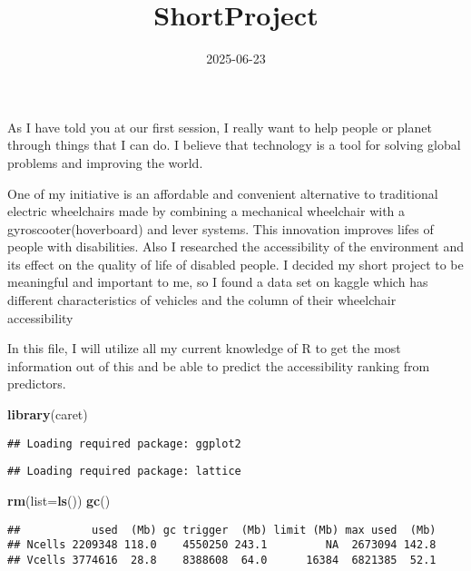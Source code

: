 \documentclass[
]{article}
\title{ShortProject}
\author{}
\date{\vspace{-2.5em}2025-06-23}
\newenvironment{Shaded}{\begin{snugshade}}{\end{snugshade}}
\newcommand{\AttributeTok}[1]{\textcolor[rgb]{0.13,0.29,0.53}{#1}}
\newcommand{\FunctionTok}[1]{\textcolor[rgb]{0.13,0.29,0.53}{\textbf{#1}}}
\newcommand{\NormalTok}[1]{#1}
\begin{document}
\maketitle

As I have told you at our first session, I really want to help people or
planet through things that I can do. I believe that technology is a tool
for solving global problems and improving the world.

One of my initiative is an affordable and convenient alternative to
traditional electric wheelchairs made by combining a mechanical
wheelchair with a gyroscooter(hoverboard) and lever systems. This
innovation improves lifes of people with disabilities. Also I researched
the accessibility of the environment and its effect on the quality of
life of disabled people. I decided my short project to be meaningful and
important to me, so I found a data set on kaggle which has different
characteristics of vehicles and the column of their wheelchair
accessibility

In this file, I will utilize all my current knowledge of R to get the
most information out of this and be able to predict the accessibility
ranking from predictors.

\begin{Shaded}
\begin{Highlighting}[]
\FunctionTok{library}\NormalTok{(caret)}
\end{Highlighting}
\end{Shaded}

\begin{verbatim}
## Loading required package: ggplot2
\end{verbatim}

\begin{verbatim}
## Loading required package: lattice
\end{verbatim}

\begin{Shaded}
\begin{Highlighting}[]
\FunctionTok{rm}\NormalTok{(}\AttributeTok{list=}\FunctionTok{ls}\NormalTok{())}
\FunctionTok{gc}\NormalTok{()}
\end{Highlighting}
\end{Shaded}

\begin{verbatim}
##           used  (Mb) gc trigger  (Mb) limit (Mb) max used  (Mb)
## Ncells 2209348 118.0    4550250 243.1         NA  2673094 142.8
## Vcells 3774616  28.8    8388608  64.0      16384  6821385  52.1
\end{verbatim}
\end{document}

